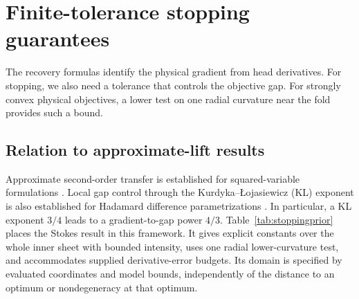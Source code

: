 \section{Finite-tolerance stopping guarantees}
\label{sec:stoppingguarantees}
The recovery formulas identify the physical gradient from head derivatives. For stopping, we also need a tolerance that controls the objective gap. For strongly convex physical objectives, a lower test on one radial curvature near the fold provides such a bound.

\subsection{Relation to approximate-lift results}
Approximate second-order transfer is established for squared-variable formulations \cite[Thm.~3.6 and Cor.~3.7]{dingwright}. Local gap control through the Kurdyka--\L{}ojasiewicz (KL) exponent is also established for Hadamard difference parametrizations \cite[Thm.~3.11 and Rem.~3.12]{ouyang}. In particular, a KL exponent $3/4$ leads to a gradient-to-gap power $4/3$. Table~\ref{tab:stoppingprior} places the Stokes result in this framework. It gives explicit constants over the whole inner sheet with bounded intensity, uses one radial lower-curvature test, and accommodates supplied derivative-error budgets. Its domain is specified by evaluated coordinates and model bounds, independently of the distance to an optimum or nondegeneracy at that optimum.

